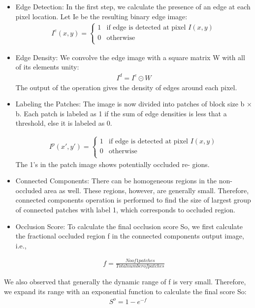 \documentclass{sig-alternate}
\begin{document}
\begin{itemize}
\item Edge Detection: In the first step, we calculate the presence of
an edge at each pixel location. Let Ie be the resulting binary
edge image:
\begin{align}
  I^e(x, y) =
  \begin{cases}
                                   1 & \text{if edge is detected at pixel $I(x, y)$} \\
                                   0 & \text{otherwise} \\
  \end{cases}
\end{align}

\item Edge Density: We convolve the edge image with a square matrix W with all of its elements unity:
\begin{align}
I^d = I^e \odot W 
\end{align}
The output of the operation gives the density of edges around
each pixel.
\item Labeling the Patches: The image is now divided into patches
of block size b × b. Each patch is labeled as 1 if the sum of
edge densities is less that a threshold, else it is labeled as 0.

\begin{align}
  I^p(x', y') =
  \begin{cases}
                                   1 & \text{if edge is detected at pixel $I(x, y)$} \\
                                   0 & \text{otherwise} \\
  \end{cases}
\end{align}
The 1’s in the patch image shows potentially occluded re-
gions.

\item Connected Components: There can be homogeneous regions in the non-occluded area as well. These regions, however, are generally small. Therefore, connected components operation
is performed to find the size of largest group of connected patches with label 1, which corresponds to occluded region.
\item Occlusion Score: To calculate the final occlusion score So, we first calculate the fractional occluded region f in the connected components output image, i.e.,

\begin{align}
f = \frac{No of 1 patches}{Total number of patches} 
\end{align}
\end{itemize}
We also observed that generally the dynamic range of f is very
small. Therefore, we expand its range with an exponential function
to calculate the final score So:
\begin{align}
S^o = 1 - e^{-f}
\end{align}
\end{document}
